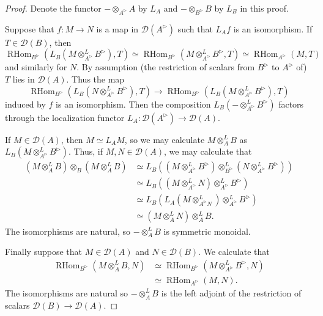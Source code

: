 \documentclass{article}
\theoremstyle{plain}
\theoremstyle{definition}
\theoremstyle{remark}
\DeclareMathOperator{\rhom}{RHom}
\newcommand{\dten}{\otimes ^{L}}
\newcommand{\huflag}{\triangleright}
\newcommand{\D}{\mathcal{D}}
\begin{document}
\begin{proof}
Denote the functor $ -\otimes _{A ^{\huflag}} A $ by $ L _{A} $ and $ -\otimes _{B ^{\huflag}} B $ by $ L _{B} $ in this proof.

Suppose that $ f: M\to N $ is a map in $ \D (A ^{\huflag}) $ such that $ L _{A} f $ is an isomorphism.
If $ T\in \D (B) $, then
\begin{equation*}
\rhom _{B ^{\huflag}}(L _{B}(M\dten _{A ^{\huflag}} B ^{\huflag}), T)\simeq
\rhom _{B ^{\huflag}}(M\dten _{A ^{\huflag}} B ^{\huflag}, T)\simeq 
\rhom _{A ^{\huflag}}(M, T)
\end{equation*}
and similarly for $ N $. By assumption (the restriction of scalars from $ B ^{\huflag} $ to $ A ^{\huflag} $ of) $ T $ lies in $ \D (A) $.
Thus the map
\begin{equation*}
\rhom _{B ^{\huflag}}(L _{B}(N\dten _{A ^{\huflag}} B ^{\huflag}), T)\to \rhom _{B ^{\huflag}}(L _{B}(M\dten _{A ^{\huflag}} B ^{\huflag}), T)
\end{equation*}
induced by $ f $ is an isomorphism.
Then the composition $ L _{B} (-\dten _{A ^{\huflag}} B ^{\huflag}) $ factors through the localization functor $ L _{A}: \D (A ^{\huflag})\to \D (A) $.

If $ M\in \D (A) $, then $ M\simeq L _{A} M $,
so we may calculate $ M \dten _{A} B $ as $ L _{B}(M \dten _{A ^{\huflag}} B ^{\huflag}) $.
Thus, if $ M,N\in \D (A) $, we may calculate that
\begin{align*}
(M\dten _{A} B)\otimes _{B} (M\dten _{A} B)
&\simeq L _{B} ( (M \dten _{A ^{\huflag}} B ^{\huflag}) \dten _{B ^{\huflag}} (N \dten _{A ^{\huflag}} B ^{\huflag}))\\
&\simeq L _{B} ( (M \dten _{A ^{\huflag}} N) \dten _{A ^{\huflag}} B ^{\huflag} )\\
&\simeq L _{B} ( L _{A}(M \dten _{A ^{\huflag} N}) \dten _{A ^{\huflag}} B ^{\huflag})\\
&\simeq (M\dten _{A} N) \dten _{A} B.
\end{align*}
The isomorphisms are natural, so $ -\dten _{A} B $ is symmetric monoidal.

Finally suppose that $ M\in \D (A) $ and $ N \in \D (B) $. We calculate that
\begin{align*}
\rhom _{B ^{\huflag}}(M \dten _{A} B, N)
&\simeq \rhom _{B ^{\huflag}}(M \dten _{A ^{\huflag}} B ^{\huflag}, N)\\
&\simeq \rhom _{A ^{\huflag}}(M, N).
\end{align*}
The isomorphisms are natural so $ -\dten _{A} B $ is the left adjoint of the restriction of scalars $ \D (B)\to \D (A) $.
\end{proof}
\end{document}
